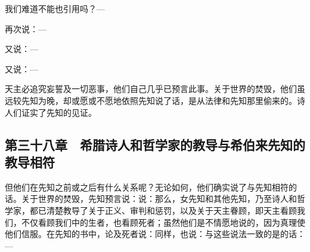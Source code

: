 我们难道不能也引用吗？—\par

\par

再次说：—\par

\par

又说：—\par

\par

又说：—\par

\par

天主必追究妄誓及一切恶事，他们自己几乎已预言此事。关于世界的焚毁，他们虽远较先知为晚，却或愿或不愿地依照先知说了话，是从法律和先知那里偷来的。诗人们证实了先知的见证。\par


\subsection{第三十八章　希腊诗人和哲学家的教导与希伯来先知的教导相符}

但他们在先知之前或之后有什么关系呢？无论如何，他们确实说了与先知相符的话。关于世界的焚毁，先知预言说：说：那么，女先知和其他先知，乃至诗人和哲学家，都已清楚教导了关于正义、审判和惩罚，以及关于天主眷顾，即天主看顾我们，不仅看顾我们中的生者，也看顾死者；虽然他们是不情愿地说的，因为真理使他们信服。在先知的书中，论及死者说：同样，也说：与这些说法一致的是的话：—\par

